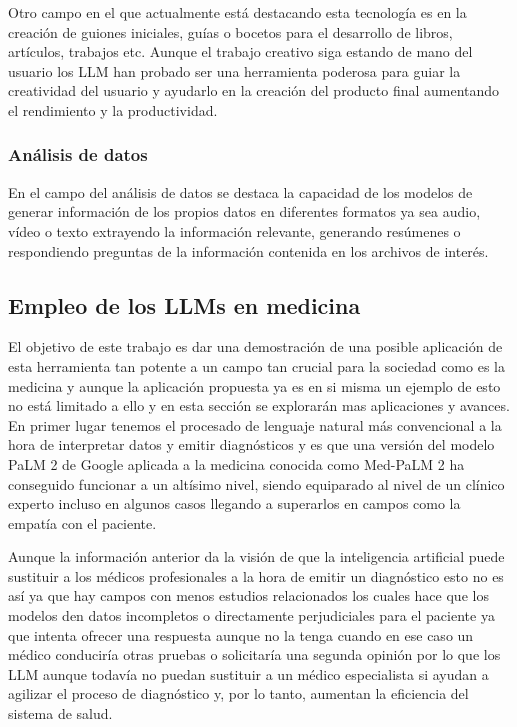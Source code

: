 Otro campo en el que actualmente está destacando esta tecnología es en la creación de guiones iniciales, guías o bocetos para el desarrollo de libros, artículos, trabajos etc. Aunque el trabajo creativo siga estando de mano del usuario los LLM han probado ser una herramienta poderosa para guiar la creatividad del usuario y ayudarlo en la creación del producto final aumentando el rendimiento y la productividad.
\subsubsection{Análisis de datos}

En el campo del análisis de datos se destaca la capacidad de los modelos de generar información de los propios datos en diferentes formatos ya sea audio, vídeo o texto extrayendo la información relevante, generando resúmenes o respondiendo preguntas de la información contenida en los archivos de interés.

\subsection{Empleo de los LLMs en medicina}

El objetivo de este trabajo es dar una demostración de una posible aplicación de esta herramienta tan potente a un campo tan crucial para la sociedad como es la medicina y aunque la aplicación propuesta ya es en si misma un ejemplo de esto no está limitado a ello y en esta sección se explorarán mas aplicaciones y avances.
En primer lugar tenemos el procesado de lenguaje natural más convencional a la hora de interpretar datos y emitir diagnósticos y es que una versión del modelo PaLM 2 de Google aplicada a la medicina conocida como Med-PaLM 2 ha conseguido funcionar a un altísimo nivel, siendo equiparado al nivel de un clínico experto incluso en algunos casos llegando a superarlos en campos como la empatía con el paciente.

Aunque la información anterior da la visión de que la inteligencia artificial puede sustituir a los médicos profesionales a la hora de emitir un diagnóstico esto no es así ya que hay campos con menos estudios relacionados los cuales hace que los modelos den datos incompletos o directamente perjudiciales para el paciente ya que intenta ofrecer una respuesta aunque no la tenga cuando en ese caso un médico conduciría otras pruebas o solicitaría una segunda opinión por lo que los LLM aunque todavía no puedan sustituir a un médico especialista si ayudan a agilizar el proceso de diagnóstico y, por lo tanto, aumentan la eficiencia del sistema de salud.

